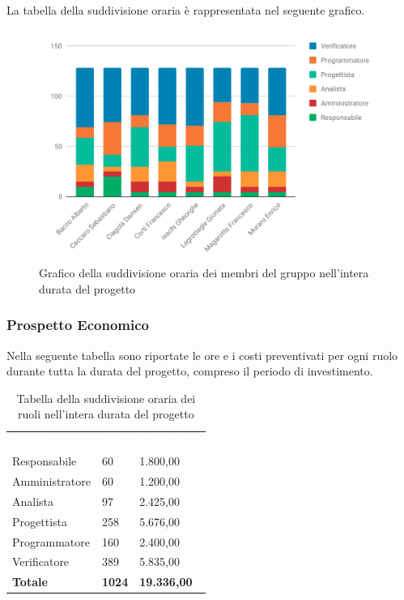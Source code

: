 La tabella della suddivisione oraria è rappresentata nel seguente grafico.
\begin{figure}[H]
	\includegraphics[width=1\linewidth]{Preventivo/grafici/TI1.pdf}
	\caption{Grafico della suddivisione oraria dei membri del gruppo nell'intera durata del progetto}
\end{figure}

\subsubsection{Prospetto Economico}
Nella seguente tabella sono riportate le ore e i costi preventivati per ogni ruolo durante tutta la durata del progetto, compreso il periodo di investimento.


\begin{table}[H]	
	\begin{center}
	    \begin{tabular}{C{4cm}C{1cm}C{3,5cm}}
			\textcolor{white}{\textbf{Ruolo}} & \textcolor{white}{\textbf{Ore}} & \textcolor{white}{\textbf{Costo in €}}
			\\
			Responsabile & 60 & 1.800,00 \\
			Amministratore & 60 & 1.200,00 \\
			Analista & 97 & 2.425,00 \\
			Progettista & 258 & 5.676,00 \\
			Programmatore & 160 & 2.400,00 \\
			Verificatore & 389 & 5.835,00 \\
			\textbf{Totale} & \textbf{1024} & \textbf{19.336,00} \\

		\end{tabular}
	    \caption{Tabella della suddivisione oraria dei ruoli nell'intera durata del progetto} \label{tab:tabellaRuoliProgInt} 
	\end{center}
\end{table}


